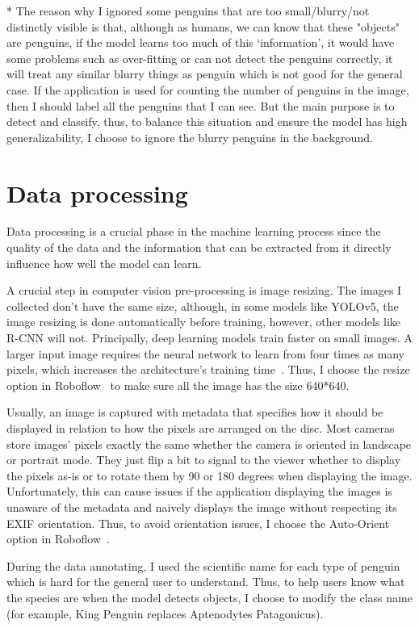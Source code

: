 \documentclass[runningheads]{llncs}
\begin{document}
* The reason why I ignored some penguins that are too small/blurry/not distinctly visible is that, although as humans, we can know that these "objects" are penguins, if the model learns too much of this `information', it would have some problems such as over-fitting or can not detect the penguins correctly, it will treat any similar blurry things as penguin which is not good for the general case. If the application is used for counting the number of penguins in the image, then I should label all the penguins that I can see. But the main purpose is to detect and classify, thus, to balance this situation and ensure the model has high generalizability, I choose to ignore the blurry penguins in the background.

\section{Data processing}
Data processing is a crucial phase in the machine learning process since the quality of the data and the information that can be extracted from it directly influence how well the model can learn. 

A crucial step in computer vision pre-processing is image resizing. The images I collected don't have the same size, although, in some models like YOLOv5, the image resizing is done automatically before training, however, other models like R-CNN will not. Principally, deep learning models train faster on small images. A larger input image requires the neural network to learn from four times as many pixels, which increases the architecture's training time~\cite{resize}. Thus, I choose the resize option in Roboflow~\cite{ref_roboflow} to make sure all the image has the size 640*640.

Usually, an image is captured with metadata that specifies how it should be displayed in relation to how the pixels are arranged on the disc. Most cameras store images' pixels exactly the same whether the camera is oriented in landscape or portrait mode. They just flip a bit to signal to the viewer whether to display the pixels as-is or to rotate them by 90 or 180 degrees when displaying the image. Unfortunately, this can cause issues if the application displaying the images is unaware of the metadata and naively displays the image without respecting its EXIF orientation. Thus, to avoid orientation issues, I choose the Auto-Orient option in Roboflow~\cite{ref_roboflow}.

During the data annotating, I used the scientific name for each type of penguin which is hard for the general user to understand. Thus, to help users know what the species are when the model detects objects, I choose to modify the class name (for example, King Penguin replaces Aptenodytes Patagonicus).
\end{document}
